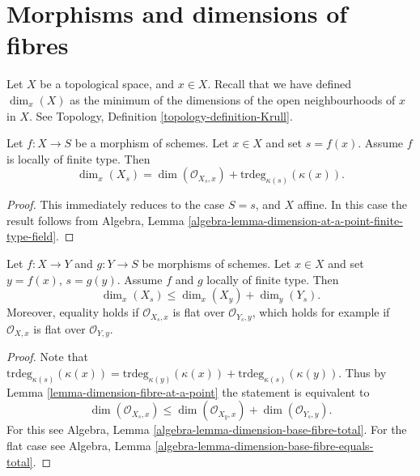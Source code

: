 \section{Morphisms and dimensions of fibres}
\label{section-dimension-fibres}

\noindent
Let $X$ be a topological space, and $x \in X$.
Recall that we have defined $\dim_x(X)$ as the minimum of the
dimensions of the open neighbourhoods of $x$ in $X$.
See Topology, Definition \ref{topology-definition-Krull}.

\begin{lemma}
\label{lemma-dimension-fibre-at-a-point}
Let $f : X \to S$ be a morphism of schemes.
Let $x \in X$ and set $s = f(x)$.
Assume $f$ is locally of finite type.
Then
$$
\dim_x(X_s) =
\dim(\mathcal{O}_{X_s, x}) + \text{trdeg}_{\kappa(s)}(\kappa(x)).
$$
\end{lemma}

\begin{proof}
This immediately reduces to the case $S = s$, and $X$ affine.
In this case the result follows from
Algebra, Lemma \ref{algebra-lemma-dimension-at-a-point-finite-type-field}.
\end{proof}

\begin{lemma}
\label{lemma-dimension-fibre-at-a-point-additive}
Let $f : X \to Y$ and $g : Y \to S$ be morphisms of schemes.
Let $x \in X$ and set $y = f(x)$, $s = g(y)$.
Assume $f$ and $g$ locally of finite type.
Then
$$
\dim_x(X_s) \leq \dim_x(X_y) + \dim_y(Y_s).
$$
Moreover, equality holds if $\mathcal{O}_{X_s, x}$ is flat
over $\mathcal{O}_{Y_s, y}$, which holds for example if $\mathcal{O}_{X, x}$
is flat over $\mathcal{O}_{Y, y}$.
\end{lemma}

\begin{proof}
Note that $\text{trdeg}_{\kappa(s)}(\kappa(x)) =
\text{trdeg}_{\kappa(y)}(\kappa(x)) + \text{trdeg}_{\kappa(s)}(\kappa(y))$.
Thus by Lemma \ref{lemma-dimension-fibre-at-a-point} the statement
is equivalent to
$$
\dim(\mathcal{O}_{X_s, x})
\leq
\dim(\mathcal{O}_{X_y, x}) + \dim(\mathcal{O}_{Y_s, y}).
$$
For this see Algebra, Lemma \ref{algebra-lemma-dimension-base-fibre-total}.
For the flat case see
Algebra, Lemma \ref{algebra-lemma-dimension-base-fibre-equals-total}.
\end{proof}

